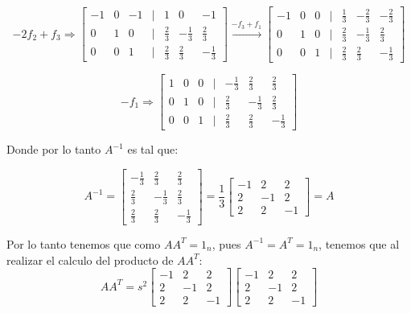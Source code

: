 \documentclass{article}
\begin{document}
\begin{enumerate}
\[
-2f_2+f_3 \Rightarrow
\begin{bmatrix}
-1 & 0 & -1 & | & 1 & 0 & -1\\
0 & 1 & 0 & | & \frac{2}{3} & -\frac{1}{3} & \frac{2}{3}\\
0 & 0 & 1 & | & \frac{2}{3} & \frac{2}{3} & -\frac{1}{3}
\end{bmatrix}
\xrightarrow{-f_3+f_1}
\begin{bmatrix}
-1 & 0 & 0 & | & \frac{1}{3} & -\frac{2}{3} & -\frac{2}{3}\\
0 & 1 & 0 & | & \frac{2}{3} & -\frac{1}{3} & \frac{2}{3}\\
0 & 0 & 1 & | & \frac{2}{3} & \frac{2}{3} & -\frac{1}{3}
\end{bmatrix}
\]

\[
-f_1 \Rightarrow
\begin{bmatrix}
1 & 0 & 0 & | &  -\frac{1}{3} & \frac{2}{3} & \frac{2}{3}\\
0 & 1 & 0 & | & \frac{2}{3} & -\frac{1}{3} & \frac{2}{3}\\
0 & 0 & 1 &  | & \frac{2}{3} & \frac{2}{3} & -\frac{1}{3}
\end{bmatrix}
\]

Donde por lo tanto $A^{-1}$ es tal que: 

\begin{equation}
\label{equ:matrices_21}
A^{-1} = \begin{bmatrix}
-\frac{1}{3} & \frac{2}{3} & \frac{2}{3} \\
\frac{2}{3} & -\frac{1}{3} & \frac{2}{3} \\
\frac{2}{3} & \frac{2}{3} & -\frac{1}{3}
\end{bmatrix} = \frac{1}{3}\begin{bmatrix}
-1 & 2 & 2 \\
2 & -1 & 2 \\
2 & 2 & -1
\end{bmatrix} = A
\end{equation}

Por lo tanto tenemos que como $AA^T = 1_{n}$, pues $A^{-1} = A^T = 1_n$, tenemos que al realizar el calculo del producto de $AA^{T}$: 
\[
AA^T = s^2\begin{bmatrix}
-1 & 2 & 2 \\
2 & -1 & 2 \\
2 & 2 & -1
\end{bmatrix}\begin{bmatrix}
-1 & 2 & 2 \\
2 & -1 & 2 \\
2 & 2 & -1
\end{bmatrix}
\]


\end{enumerate}
\end{document}
